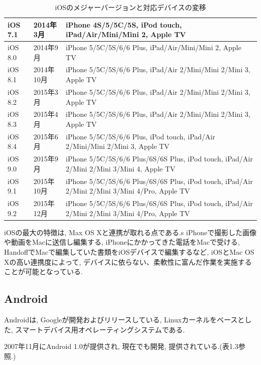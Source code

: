 \begin{table}[htb]
\begin{center}
\begin{tabular}{|l|l|p{10cm}|}
iOS 7.1 & 2014年3月 & iPhone 4S/5/5C/5S, iPod touch, iPad/Air/Mini/Mini 2, Apple TV \\ \hline
iOS 8.0 & 2014年9月 & iPhone 5/5C/5S/6/6 Plus, iPad/Air/Mini/Mini 2, Apple TV \\ \hline
iOS 8.1 & 2014年10月 & iPhone 5/5C/5S/6/6 Plus, iPad/Air 2/Mini/Mini 2/Mini 3, Apple TV \\ \hline
iOS 8.2 & 2015年3月 & iPhone 5/5C/5S/6/6 Plus, iPad/Air 2/Mini/Mini 2/Mini 3, Apple TV \\ \hline
iOS 8.3 & 2015年4月 & iPhone 5/5C/5S/6/6 Plus, iPad/Air 2/Mini/Mini 2/Mini 3, Apple TV \\ \hline
iOS 8.4 & 2015年6月 & iPhone 5/5C/5S/6/6 Plus, iPod touch, iPad/Air 2/Mini/Mini 2/Mini 3, Apple TV \\ \hline
iOS 9.0 & 2015年9月 & iPhone 5/5C/5S/6/6 Plus/6S/6S Plus, iPod touch, iPad/Air 2/Mini 2/Mini 3/Mini 4, Apple TV \\ \hline
iOS 9.1 & 2015年10月 & iPhone 5/5C/5S/6/6 Plus/6S/6S Plus, iPod touch, iPad/Air 2/Mini 2/Mini 3/Mini 4/Pro, Apple TV \\ \hline
iOS 9.2 & 2015年12月 & iPhone 5/5C/5S/6/6 Plus/6S/6S Plus, iPod touch, iPad/Air 2/Mini 2/Mini 3/Mini 4/Pro, Apple TV \\ \hline
\end{tabular}
\caption{iOSのメジャーバージョンと対応デバイスの変移}
\end{center}
\end{table}

iOSの最大の特徴は, Max OS Xと連携が取れる点である.s
iPhoneで撮影した画像や動画をMacに送信し編集する, iPhoneにかかってきた電話をMacで受ける, HandoffでMacで編集していた書類をiOSデバイスで編集するなど, iOSとMac OS Xの高い連携度によって, デバイスに依らない、柔軟性に富んだ作業を実施することが可能となっている.

\subsection{Android}
Androidは, Googleが開発およびリリースしている, Linuxカーネルをベースとした, スマートデバイス用オペレーティングシステムである.

2007年11月にAndroid 1.0が提供され, 現在でも開発, 提供されている.(表1.3参照.)

